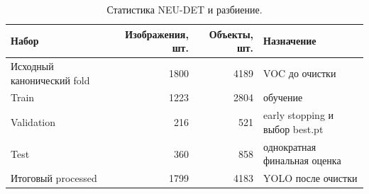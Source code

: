 \begin{table}[t]
\centering
\caption{Статистика NEU-DET и разбиение.}
\label{tab:dataset}
\scriptsize
\begin{tabular}{p{}rrp{}}
\hline
Набор & Изображения, шт. & Объекты, шт. & Назначение \\
\hline
Исходный канонический fold & 1800 & 4189 & VOC до очистки \\
Train & 1223 & 2804 & обучение \\
Validation & 216 & 521 & early stopping и выбор best.pt \\
Test & 360 & 858 & однократная финальная оценка \\
Итоговый processed & 1799 & 4183 & YOLO после очистки \\
\hline
\end{tabular}
\end{table}
